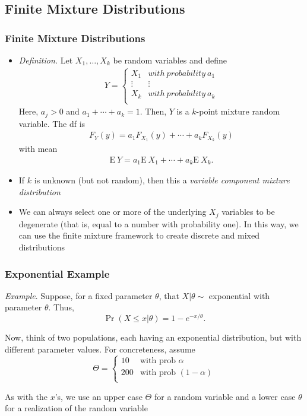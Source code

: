 \documentclass{beamer}
\begin{document}
\subsection{Finite Mixture Distributions}

\begin{frame}%
\frametitle{Finite Mixture Distributions}
\begin{itemize}
\item \emph{Definition.} Let $X_1, \ldots, X_k$ be random variables and define
\begin{eqnarray*}
Y =\left\{
\begin{array}{cc}
X_1 & with~probability~a_1 \\
\vdots & \vdots \\
X_k & with~probability~a_k \\
\end{array}
\right.
\end{eqnarray*}
Here, $a_{j}>0$ and $ a_1+ \cdots + a_k = 1.$ Then, $Y$ is a $k$-point mixture random variable. The df is
\begin{eqnarray*}
F_Y(y) = a_1 F_{X_1}(y)+ \cdots +a_k F_{X_k}(y)
\end{eqnarray*}
with mean
\begin{eqnarray*}
\mathrm{E~}Y = a_1 \mathrm{E~}X_1 + \cdots + a_k \mathrm{E~}X_k.
\end{eqnarray*}
\item If $k$ is unknown (but not random), then this a \emph{variable component mixture
distribution} %
\item We can always select one or more of the underlying $X_j$ variables to be degenerate (that is, equal to a number with probability one). In this way, we can use the finite mixture framework to create discrete and mixed distributions
\end{itemize}
\end{frame}


\begin{frame}[shrink=2]
\frametitle{Exponential Example}
\textit{Example}. Suppose, for a fixed parameter $\theta$, that
$X|\theta \sim$ exponential with parameter $\theta$. Thus,
\begin{equation*}
\Pr(X \le x | \theta) = 1 - e^{-x/\theta}.
\end{equation*} \vspace{2mm}

Now, think of two populations, each having an exponential
distribution, but with different parameter values. For concreteness,
assume
\begin{equation*}
 \Theta =
\begin{cases}
10 &  \text{with prob~}\alpha\\
200 & \text{with prob~}(1-\alpha)\\
\end{cases}
\end{equation*} \vspace{2mm}

As with the $x$'s, we use an upper case $\Theta$ for a random
variable and a lower case $\theta$ for a realization of the random
variable
\end{frame}
\end{document}
